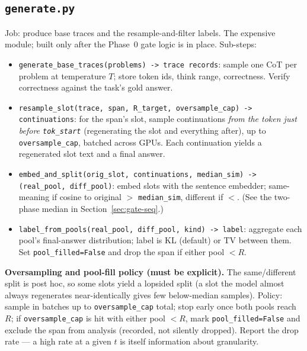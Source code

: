 \documentclass[11pt]{article}
\newcommand{\modu}[1]{\texttt{#1}}
\newcommand{\fn}[1]{\texttt{#1}}
\begin{document}
\subsection{\modu{generate.py}}
Job: produce base traces and the resample-and-filter labels. The expensive module; built only after the Phase~0 gate logic is in place. Sub-steps:
\begin{itemize}[leftmargin=1.5em]
  \item \fn{generate\_base\_traces(problems) -> trace records}: sample one CoT per problem at temperature $T$; store token ids, think range, correctness. Verify correctness against the task's gold answer.
  \item \fn{resample\_slot(trace, span, R\_target, oversample\_cap) -> continuations}: for the span's slot, sample continuations \emph{from the token just before \texttt{tok\_start}} (regenerating the slot and everything after), up to \texttt{oversample\_cap}, batched across GPUs. Each continuation yields a regenerated slot text and a final answer.
  \item \fn{embed\_and\_split(orig\_slot, continuations, median\_sim) -> (real\_pool, diff\_pool)}: embed slots with the sentence embedder; same-meaning if cosine to original $>$ \texttt{median\_sim}, different if $<$. (See the two-phase median in Section~\ref{sec:gate-seq}.)
  \item \fn{label\_from\_pools(real\_pool, diff\_pool, kind) -> label}: aggregate each pool's final-answer distribution; label is KL (default) or TV between them. Set \texttt{pool\_filled=False} and drop the span if either pool $< R$.
\end{itemize}

\begin{notebox}
\textbf{Oversampling and pool-fill policy (must be explicit).} The same/different split is post hoc, so some slots yield a lopsided split (a slot the model almost always regenerates near-identically gives few below-median samples). Policy: sample in batches up to \texttt{oversample\_cap} total; stop early once both pools reach $R$; if \texttt{oversample\_cap} is hit with either pool $< R$, mark \texttt{pool\_filled=False} and exclude the span from analysis (recorded, not silently dropped). Report the drop rate --- a high rate at a given $t$ is itself information about granularity.
\end{notebox}
\end{document}

